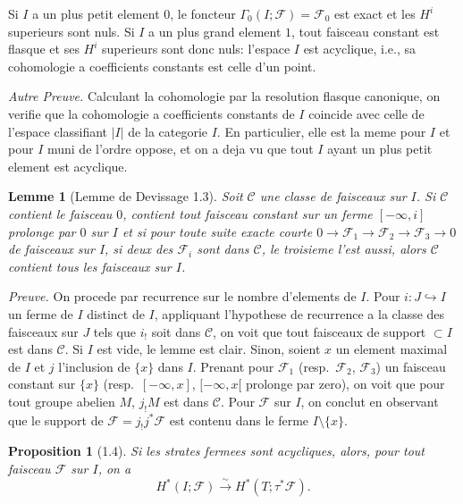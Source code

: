 \documentclass[11pt,a4paper]{article}
\theoremstyle{plain}
\newtheorem{lemma}[theorem]{Lemme}
\newtheorem{proposition}[theorem]{Proposition}
\theoremstyle{definition}
\begin{document}
Si $I$ a un plus petit element $0$, le foncteur $\Gamma_0(I;\mathcal{F}) = \mathcal{F}_0$ est exact et les $H^i$ superieurs sont nuls. Si $I$ a un plus grand element $1$, tout faisceau constant est flasque et ses $H^i$ superieurs sont donc nuls: l'espace $I$ est acyclique, i.e., sa cohomologie a coefficients constants est celle d'un point.

\textit{Autre Preuve.} Calculant la cohomologie par la resolution flasque canonique, on verifie que la cohomologie a coefficients constants de $I$ coincide avec celle de l'espace classifiant $|I|$ de la categorie $I$. En particulier, elle est la meme pour $I$ et pour $I$ muni de l'ordre oppose, et on a deja vu que tout $I$ ayant un plus petit element est acyclique.

\begin{lemma}[Lemme de Devissage 1.3]\label{lem:1.3}
Soit $\mathcal{C}$ une classe de faisceaux sur $I$. Si $\mathcal{C}$ contient le faisceau $0$, contient tout faisceau constant sur un ferme $[-\infty,i]$ prolonge par $0$ sur $I$ et si pour toute suite exacte courte $0 \to \mathcal{F}_1 \to \mathcal{F}_2 \to \mathcal{F}_3 \to 0$ de faisceaux sur $I$, si deux des $\mathcal{F}_i$ sont dans $\mathcal{C}$, le troisieme l'est aussi, alors $\mathcal{C}$ contient tous les faisceaux sur $I$.
\end{lemma}

\noindent\textit{Preuve.} On procede par recurrence sur le nombre d'elements de $I$. Pour $i: J \hookrightarrow I$ un ferme de $I$ distinct de $I$, appliquant l'hypothese de recurrence a la classe des faisceaux sur $J$ tels que $i_!$ soit dans $\mathcal{C}$, on voit que tout faisceaux de support $\subset I$ est dans $\mathcal{C}$. Si $I$ est vide, le lemme est clair. Sinon, soient $x$ un element maximal de $I$ et $j$ l'inclusion de $\{x\}$ dans $I$. Prenant pour $\mathcal{F}_1$ (resp.~$\mathcal{F}_2$, $\mathcal{F}_3$) un faisceau constant sur $\{x\}$ (resp.~$[-\infty,x]$, $[-\infty,x[$ prolonge par zero), on voit que pour tout groupe abelien $M$, $j_!M$ est dans $\mathcal{C}$. Pour $\mathcal{F}$ sur $I$, on conclut en observant que le support de $\mathcal{F} = j_!j^*\mathcal{F}$ est contenu dans le ferme $I \setminus \{x\}$.

\begin{proposition}[1.4]\label{prop:1.4}
Si les strates fermees sont acycliques, alors, pour tout faisceau $\mathcal{F}$ sur $I$, on a
\begin{equation}\label{eq:1.4.1}
H^*(I;\mathcal{F}) \xrightarrow{\sim} H^*(T;\tau^*\mathcal{F}).
\tag{1.4.1}
\end{equation}
\end{proposition}
\end{document}
